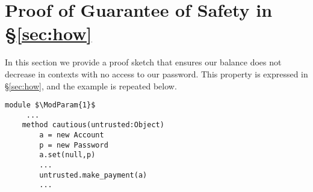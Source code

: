 \section{Proof of Guarantee of Safety in \S\ref{sec:how}}
\label{app:safety}

In this section we provide a proof sketch that \SrobustB ensures our balance
does not decrease in contexts with no access to our password. This 
property is expressed in \S\ref{sec:how}, and the example is repeated below.

\begin{lstlisting}[mathescape=true, language=chainmail, frame=lines]
module $\ModParam{1}$
     ...
    method cautious(untrusted:Object)
        a = new Account
        p = new Password
        a.set(null,p)
        ...
        untrusted.make_payment(a)
        ...
\end{lstlisting}

